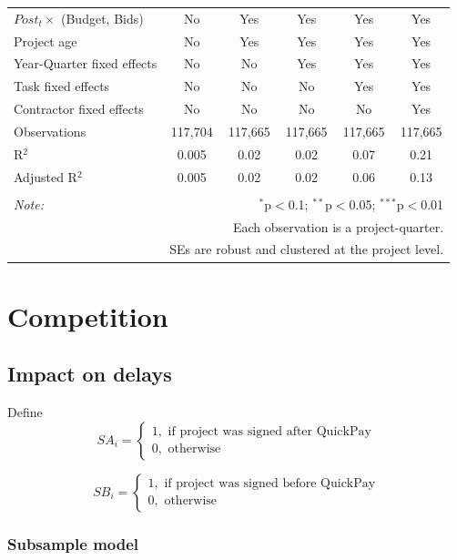 \documentclass[
]{article}
\begin{document}
\begin{table}[H]
\begin{tabular}{@{\extracolsep{-2pt}}lccccc}
$Post_t \times $  (Budget, Bids) & No & Yes & Yes & Yes & Yes \\ 
Project age & No & Yes & Yes & Yes & Yes \\ 
Year-Quarter fixed effects & No & No & Yes & Yes & Yes \\ 
Task fixed effects & No & No & No & Yes & Yes \\ 
Contractor fixed effects & No & No & No & No & Yes \\ 
Observations & 117,704 & 117,665 & 117,665 & 117,665 & 117,665 \\ 
R$^{2}$ & 0.005 & 0.02 & 0.02 & 0.07 & 0.21 \\ 
Adjusted R$^{2}$ & 0.005 & 0.02 & 0.02 & 0.06 & 0.13 \\ 
\hline 
\hline \\[-1.8ex] 
\textit{Note:}  & \multicolumn{5}{r}{$^{*}$p$<$0.1; $^{**}$p$<$0.05; $^{***}$p$<$0.01} \\ 
 & \multicolumn{5}{r}{Each observation is a project-quarter.} \\ 
 & \multicolumn{5}{r}{SEs are robust and clustered at the project level.} \\ 
\end{tabular} 
\end{table}

\hypertarget{competition}{%
\section{Competition}\label{competition}}

\hypertarget{impact-on-delays}{%
\subsection{Impact on delays}\label{impact-on-delays}}

Define
\[ SA_i = \begin{cases} 1, \text{ if project was signed after QuickPay}\\
0, \text{ otherwise} \end{cases}\]

\[ SB_i = \begin{cases} 1, \text{ if project was signed before QuickPay}\\
0, \text{ otherwise} \end{cases}\]

\hypertarget{subsample-model}{%
\subsubsection{Subsample model}\label{subsample-model}}
\end{document}
